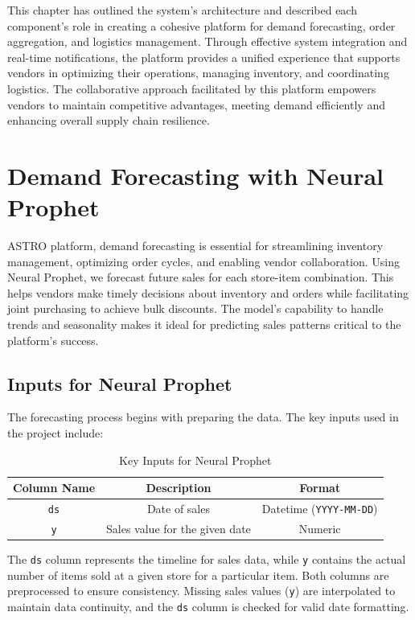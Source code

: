 This chapter has outlined the system's architecture and described each component's role in creating a cohesive platform for demand forecasting, order aggregation, and logistics management. Through effective system integration and real-time notifications, the platform provides a unified experience that supports vendors in optimizing their operations, managing inventory, and coordinating logistics. The collaborative approach facilitated by this platform empowers vendors to maintain competitive advantages, meeting demand efficiently and enhancing overall supply chain resilience.
\section{Demand Forecasting with Neural Prophet}

ASTRO platform, demand forecasting is essential for streamlining inventory management, optimizing order cycles, and enabling vendor collaboration. Using Neural Prophet, we forecast future sales for each store-item combination. This helps vendors make timely decisions about inventory and orders while facilitating joint purchasing to achieve bulk discounts. The model’s capability to handle trends and seasonality makes it ideal for predicting sales patterns critical to the platform’s success.

\subsection{Inputs for Neural Prophet}

The forecasting process begins with preparing the data. The key inputs used in the project include:

\begin{table}[h!]
    \centering
    \begin{tabular}{|c|c|c|}
        \hline
        \textbf{Column Name} & \textbf{Description}           & \textbf{Format}                \\
        \hline
        \texttt{ds}          & Date of sales                  & Datetime (\texttt{YYYY-MM-DD}) \\
        \hline
        \texttt{y}           & Sales value for the given date & Numeric                        \\
        \hline
    \end{tabular}
    \caption{Key Inputs for Neural Prophet}
\end{table}

The \texttt{ds} column represents the timeline for sales data, while \texttt{y} contains the actual number of items sold at a given store for a particular item. Both columns are preprocessed to ensure consistency. Missing sales values (\texttt{y}) are interpolated to maintain data continuity, and the \texttt{ds} column is checked for valid date formatting.


